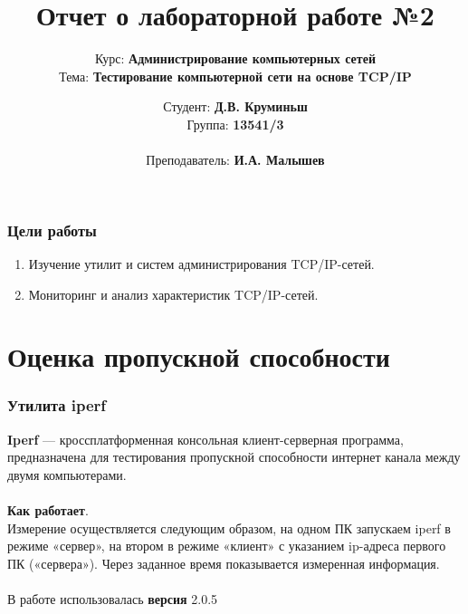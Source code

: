 \documentclass[9pt, compress]{beamer}
\author{Студент: \textbf{Д.В. Круминьш}\\ 
	Группа: \textbf{13541/3}\\ \\
	Преподаватель: \textbf{И.А. Малышев} }
\title{Отчет о лабораторной работе №2}
\subtitle{Курс: \textbf{Администрирование компьютерных сетей}\\
Тема: \textbf{Тестирование компьютерной сети на основе TCP/IP}}
\institute{Санкт-Петербургский политехнический университет Петра Великого}
\date{ }
\begin{document}
	\maketitle
\begin{frame}
\frametitle{Цели работы}
\begin{enumerate}
\item Изучение утилит и систем администрирования TCP/IP-сетей.
\item Мониторинг и анализ характеристик TCP/IP-сетей.
\end{enumerate}
\end{frame}

\section{Оценка пропускной способности}
\begin{frame}
\frametitle{Утилита iperf}
\textbf{Iperf} — кроссплатформенная консольная клиент-серверная программа, предназначена для тестирования пропускной способности интернет канала между двумя компьютерами.\\\\
\textbf{Как работает}.\\
Измерение осуществляется следующим образом, на одном ПК запускаем iperf в режиме «сервер», на втором в режиме «клиент» с указанием ip-адреса первого ПК («сервера»). Через заданное время показывается измеренная информация.\\\\
В работе использовалась \textbf{версия} 2.0.5
\end{frame}
\end{document}
